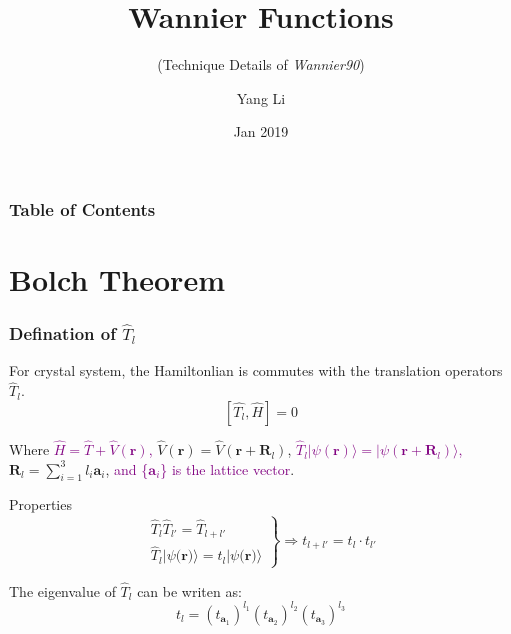 \documentclass{beamer}
\title[CMT.Tsinghua]{Wannier Functions}
\subtitle{(Technique Details of \emph{Wannier90})}
\author[Yang Li]
{Yang Li\inst{1}}
\institute[Physics@Tsinghua] 
{
  \inst{1}%
  Department of Physics\\
  Tsinghua University 
}
\date[Tsinghua Physics 2019]{Jan 2019}
\begin{document}
  \frame{\titlepage}

  \begin{frame}
    \frametitle{Table of Contents}
    \tableofcontents
  \end{frame}
  
  \section{Bolch Theorem}

  \begin{frame}
    \frametitle{Defination of \(\widehat{T}_l\)}
    For crystal system, the Hamiltonlian is commutes with the translation operators \(\widehat{T}_l\).
    \begin{equation}
      \left[\widehat{T_l},\widehat{H}\right] = 0
    \end{equation}

    Where  \textcolor{purple}{\(\widehat{H} = \widehat{T} + \widehat{V}(\mathbf{r})\),} \(\widehat{V}(\mathbf{r}) = \widehat{V}(\mathbf{r}+\mathbf{R}_l)\), \textcolor{purple}{\(\widehat{T}_l|\psi(\mathbf{r})\rangle = |\psi(\mathbf{r}+\mathbf{R}_l)\rangle\),} \(\mathbf{R}_l = \sum_{i=1}^3l_i\mathbf{a}_i\), \textcolor{purple}{and \{\(\mathbf{a}_i\)\} is the lattice vector}.
     
    \begin{block}{Properties}
      \begin{displaymath} 
        \left. \begin{array}{r}
          \widehat{T}_l\widehat{T}_{l'} = \widehat{T}_{l+l'}\\
          \widehat{T}_l|\psi({\mathbf{r})}\rangle = t_l|\psi({\mathbf{r})}\rangle
        \end{array}  \right\} \Rightarrow t_{l+l'} = t_l\cdot{}t_{l'}
      \end{displaymath}
    \end{block}

    The eigenvalue of \(\widehat{T}_l\) can be writen as: 
    \begin{equation}
      t_l = \left(t_{\mathbf{a}_1}\right)^{l_1}\left(t_{\mathbf{a}_2}\right)^{l_2}\left(t_{\mathbf{a}_3}\right)^{l_3}
    \end{equation}  

  \end{frame}
\end{document}
